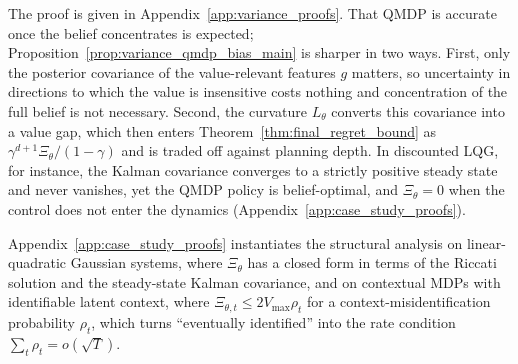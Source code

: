 The proof is given in Appendix~\ref{app:variance_proofs}.
That QMDP is accurate once the belief concentrates is expected; Proposition~\ref{prop:variance_qmdp_bias_main} is sharper in two ways.
First, only the posterior covariance of the value-relevant features $g$ matters, so uncertainty in directions to which the value is insensitive costs nothing and concentration of the full belief is not necessary.
Second, the curvature $L_\theta$ converts this covariance into a value gap, which then enters Theorem~\ref{thm:final_regret_bound} as $\gamma^{d+1}\Xi_\theta/(1-\gamma)$ and is traded off against planning depth.
In discounted LQG, for instance, the Kalman covariance converges to a strictly positive steady state and never vanishes, yet the QMDP policy is belief-optimal, and $\Xi_\theta=0$ when the control does not enter the dynamics (Appendix~\ref{app:case_study_proofs}).

Appendix~\ref{app:case_study_proofs} instantiates the structural analysis on linear-quadratic Gaussian systems, where $\Xi_\theta$ has a closed form in terms of the Riccati solution and the steady-state Kalman covariance, and on contextual MDPs with identifiable latent context, where $\Xi_{\theta,t}\le 2V_{\max}\rho_t$ for a context-misidentification probability $\rho_t$, which turns ``eventually identified'' into the rate condition $\sum_t\rho_t=o(\sqrt T)$.


